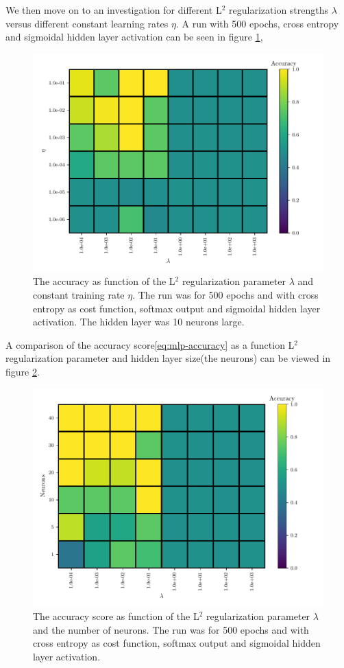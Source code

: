 We then move on to an investigation for different L$^2$ regularization strengths $\lambda$ versus different constant learning rates $\eta$. A run with 500 epochs, cross entropy and sigmoidal hidden layer activation can be seen in figure \ref{fig:mlp-eta-lambda},
\begin{figure}[H]
    \centering
    \includegraphics[scale=1.0]{../fig/mlp_lambda_eta.pdf}
    \caption{The accuracy as function of the L$^2$ regularization parameter $\lambda$ and constant training rate $\eta$. The run was for 500 epochs and with cross entropy as cost function, softmax output and sigmoidal hidden layer activation. The hidden layer was 10 neurons large.}
    \label{fig:mlp-eta-lambda}
\end{figure}

A comparison of the accuracy score\eqref{eq:mlp-accuracy} as a function L$^2$ regularization parameter and hidden layer size(the neurons) can be viewed in figure \ref{fig:mlp-lambda-neurons}.
\begin{figure}[H]
    \centering
    \includegraphics[scale=1.0]{../fig/mlp_lambda_neurons.pdf}
    \caption{The accuracy score as function of the L$^2$ regularization parameter $\lambda$ and the number of neurons. The run was for 500 epochs and with cross entropy as cost function, softmax output and sigmoidal hidden layer activation.}
    \label{fig:mlp-lambda-neurons}
\end{figure}

